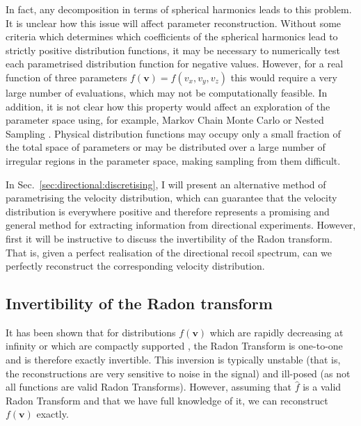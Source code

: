 In fact, any decomposition in terms of spherical harmonics leads to this problem. It is unclear how this issue will affect parameter reconstruction. Without some criteria which determines which coefficients of the spherical harmonics lead to strictly positive distribution functions, it may be necessary to numerically test each parametrised distribution function for negative values. However, for a real function of three parameters $f(\textbf{v}) = f(v_x, v_y, v_z)$ this would require a very large number of evaluations, which may not be computationally feasible. In addition, it is not clear how this property would affect an exploration of the parameter space using, for example, Markov Chain Monte Carlo or Nested Sampling \cite{OrRefToSec}. Physical distribution functions may occupy only a small fraction of the total space of parameters or may be distributed over a large number of irregular regions in the parameter space, making sampling from them difficult.

In Sec.~\ref{sec:directional:discretising}, I will present an alternative method of parametrising the velocity distribution, which can guarantee that the velocity distribution is everywhere positive and therefore represents a promising and general method for extracting information from directional experiments. However, first it will be instructive to discuss the invertibility of the Radon transform. That is, given a perfect realisation of the directional recoil spectrum, can we perfectly reconstruct the corresponding velocity distribution.


\subsection{Invertibility of the Radon transform} 


It has been shown that for distributions \(f(\textbf{v})\) which are rapidly decreasing at infinity \cite{Helgason:1999} or which are compactly supported \cite{Quinto:1983}, the Radon Transform is one-to-one and is therefore exactly invertible. This inversion is typically unstable (that is, the reconstructions are very sensitive to noise in the signal) and ill-posed (as not all functions are valid Radon Transforms). However, assuming that \(\hat{f}\) is a valid Radon Transform and that we have full knowledge of it, we can reconstruct $f(\textbf{v})$ exactly.

